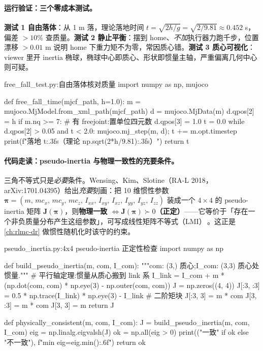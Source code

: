 \paragraph{运行验证：三个零成本测试。}\textbf{测试 1 自由落体}：从 1 m 落，理论落地时间 $t=\sqrt{2h/g}=\sqrt{2/9.81}\approx0.452$ s，偏差 $>10\%$ 查质量。\textbf{测试 2 静止平衡}：摆到 home、\emph{不加}执行器力跑千步，位置漂移 $>0.01$ m 说明 home 下重力矩不为零，常因质心错。\textbf{测试 3 质心可视化}：viewer 里开 inertia 椭球，椭球中心即质心、形状即惯量主轴，严重偏离几何中心则可疑。

\begin{codebox}[Python]{free\_fall\_test.py:自由落体核对质量}
import numpy as np, mujoco

def free_fall_time(mjcf_path, h=1.0):
    m = mujoco.MjModel.from_xml_path(mjcf_path)
    d = mujoco.MjData(m)
    d.qpos[2] = h
    if m.nq >= 7:                      # 有 freejoint:置单位四元数
        d.qpos[3] = 1.0
    t = 0.0
    while d.qpos[2] > 0.05 and t < 2.0:
        mujoco.mj_step(m, d); t += m.opt.timestep
    print(f"落地 {t:.3f}s（理论 {np.sqrt(2*h/9.81):.3f}s）")
    return t
\end{codebox}

\paragraph{代码走读：pseudo-inertia 与物理一致性的充要条件。}三角不等式只是\emph{必要}条件。Wensing、Kim、Slotine（RA-L 2018，arXiv:1701.04395）给出\emph{充要}刻画：把 10 维惯性参数 $\boldsymbol\pi=(m,\,mc_x,\,mc_y,\,mc_z,\,I_{xx},\,I_{xy},\,I_{xz},\,I_{yy},\,I_{yz},\,I_{zz})$ 装成一个 $4\times4$ 的 pseudo-inertia 矩阵 $\mathbf{J}(\boldsymbol\pi)$，则\textbf{物理一致 $\iff \mathbf{J}(\boldsymbol\pi)\succ 0$（正定）}——它等价于「存在一个非负质量分布产生这组参数」，可写成线性矩阵不等式（LMI）\,\cite{wensing2018lmi}。这正是 \cref{ch:rlmc-dr} 做惯性随机化时该守的约束。

\begin{codebox}[Python]{pseudo\_inertia.py:4x4 pseudo-inertia 正定性检查}
import numpy as np

def build_pseudo_inertia(m, com, I_com):
    """com: (3,) 质心;I_com: (3,3) 质心处惯量."""
    # 平行轴定理:惯量从质心搬到 link 系
    I_link = I_com + m * (np.dot(com, com) * np.eye(3) - np.outer(com, com))
    J = np.zeros((4, 4))
    J[:3, :3] = 0.5 * np.trace(I_link) * np.eye(3) - I_link   # 二阶矩块
    J[:3, 3] = m * com
    J[3, :3] = m * com
    J[3, 3] = m
    return J

def physically_consistent(m, com, I_com):
    J = build_pseudo_inertia(m, com, I_com)
    eig = np.linalg.eigvalsh(J)
    ok = np.all(eig > 0)
    print(("一致" if ok else "不一致"), f"min eig={eig.min():.6f}")
    return ok
\end{codebox}

